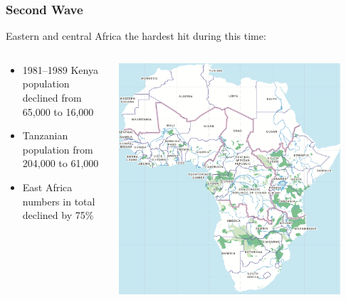 \documentclass[10pt]{beamer}
\begin{document}
\begin{frame}[t]
\frametitle{Second Wave}
\vspace{0.5cm}

	Eastern and central Africa the hardest hit during this time:\\
	
	\vspace{0.25cm}
	
	\begin{columns}
		\begin{column}{0.5\textwidth}
			\begin{itemize}
				\item 1981--1989 Kenya population declined from 65,000 to 16,000
				\smallskip
				\item Tanzanian population from 204,000 to 61,000\\
				\smallskip
				\item East Africa numbers in total declined by 75\%
			\end{itemize}
		\end{column}
		
		\begin{column}{0.5\textwidth}
			\begin{center}
				\includegraphics[width=0.90\textwidth]{figures/africa.png}
			\end{center}
		\end{column}
	\end{columns}
\end{frame}
\end{document}
